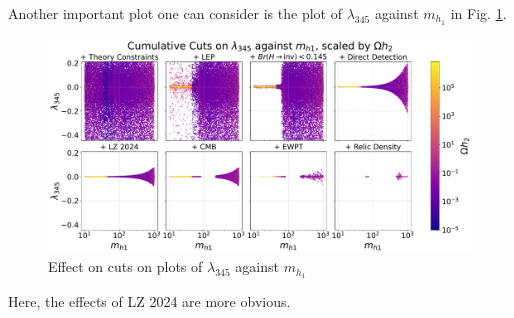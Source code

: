 \documentclass[12pt]{article}
\newcommand{\mhone}{m_{h_1}}
\begin{document}
Another important plot one can consider is the plot of $\lambda_{345}$ against $\mhone$ in Fig. \ref{fig:l345_md1}. 
\begin{figure}[H]
    \centering
    \includegraphics[width=\linewidth]{big_plots_(low_dpi)/l345_against_MD1_Omegah2.pdf}
    \caption{Effect on cuts on plots of $\lambda_{345}$ against $\mhone$}
    \label{fig:l345_md1}
\end{figure}
Here, the effects of LZ 2024 are more obvious. 
\end{document}
